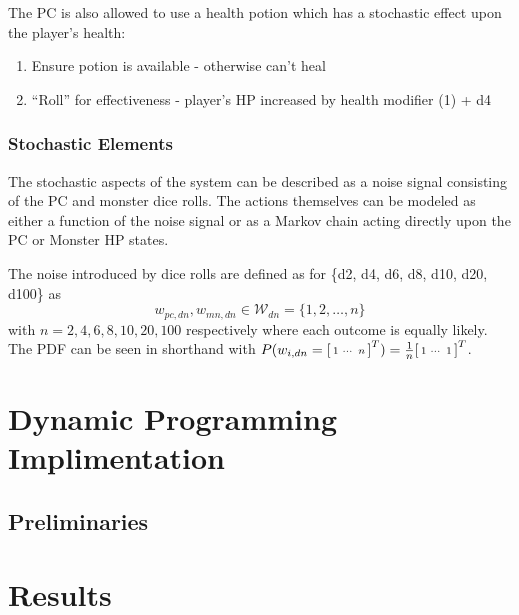 \documentclass[letterpaper, 10 pt, conference]{ieeeconf}
\begin{document}
The PC is also allowed to use a health potion which has a stochastic effect upon the player's health:
\begin{enumerate}
    \item Ensure potion is available - otherwise can't heal
    \item ``Roll'' for effectiveness - player's HP increased by health modifier (1) + d4
\end{enumerate}

\subsubsection{Stochastic Elements}
The stochastic aspects of the system can be described as a noise signal consisting of the PC and monster dice rolls.
The actions themselves can be modeled as either a function of the noise signal or as a Markov chain acting directly upon the PC or Monster HP states.


The noise introduced by dice rolls are defined as for \{d2, d4, d6, d8, d10, d20, d100\} as 
\[
    w_{pc,dn}, w_{mn,dn} \in \mathcal{W}_{dn} = \{1,2,\dots,n\}
\] with $n = 2,4,6,8,10,20,100$ respectively where each outcome is equally likely.
The PDF can be seen in shorthand with $P(w_{i,dn} = \smqty[1 & \cdots & n]^T) = \frac{1}{n}\smqty[1 & \cdots & 1]^T$.
% 






\section{Dynamic Programming Implimentation}

\subsection{Preliminaries}








\section{Results}













% 
\end{document}

